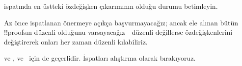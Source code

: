 \begin{prob}
 ispatında en üstteki özdeğişken çıkarımının
\Elim{\lexists} olduğu durumu betimleyin.
\end{prob}

Az önce ispatlanan önermeye açıkça başvurmayacağız; ancak ele alınan bütün
!!{proof}s{}ın düzenli olduğunu varsayacağız---düzenli değillerse
özdeğişkenlerini değiştirerek onları her zaman düzenli kılabiliriz.

 ve ,  ve~
için de geçerlidir. İspatları alıştırma olarak bırakıyoruz.

